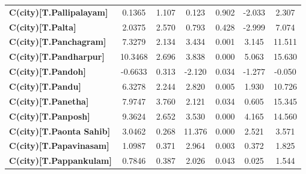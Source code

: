 \begin{center}
\begin{tabular}{lcccccc}
\textbf{C(city)[T.Pallipalayam]}                                                                    &       0.1365  &        1.107     &     0.123  &         0.902        &       -2.033    &        2.307     \\
\textbf{C(city)[T.Palta]}                                                                           &       2.0375  &        2.570     &     0.793  &         0.428        &       -2.999    &        7.074     \\
\textbf{C(city)[T.Panchagram]}                                                                      &       7.3279  &        2.134     &     3.434  &         0.001        &        3.145    &       11.511     \\
\textbf{C(city)[T.Pandharpur]}                                                                      &      10.3468  &        2.696     &     3.838  &         0.000        &        5.063    &       15.630     \\
\textbf{C(city)[T.Pandoh]}                                                                          &      -0.6633  &        0.313     &    -2.120  &         0.034        &       -1.277    &       -0.050     \\
\textbf{C(city)[T.Pandu]}                                                                           &       6.3278  &        2.244     &     2.820  &         0.005        &        1.930    &       10.726     \\
\textbf{C(city)[T.Panetha]}                                                                         &       7.9747  &        3.760     &     2.121  &         0.034        &        0.605    &       15.345     \\
\textbf{C(city)[T.Panposh]}                                                                         &       9.3624  &        2.652     &     3.530  &         0.000        &        4.165    &       14.560     \\
\textbf{C(city)[T.Paonta Sahib]}                                                                    &       3.0462  &        0.268     &    11.376  &         0.000        &        2.521    &        3.571     \\
\textbf{C(city)[T.Papavinasam]}                                                                     &       1.0987  &        0.371     &     2.964  &         0.003        &        0.372    &        1.825     \\
\textbf{C(city)[T.Pappankulam]}                                                                     &       0.7846  &        0.387     &     2.026  &         0.043        &        0.025    &        1.544     \\

\end{tabular}
\end{center}
